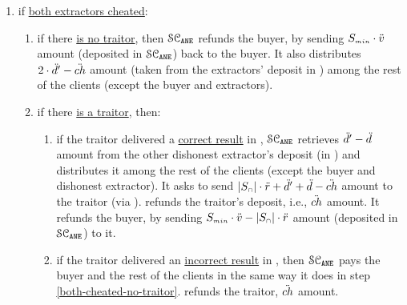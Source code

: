 \begin{itemize}
\begin{enumerate}
%
\item if \underline{both extractors cheated}:
%
\begin{enumerate}
%
\item\label{both-cheated-no-traitor} if there \underline{is no traitor}, then $\mathcal{SC}_{\mathtt{ANE}}$ refunds the buyer, by sending $S_{\scriptscriptstyle min}\cdot \ddot{v}$ amount (deposited in $\mathcal{SC}_{\mathtt{ANE}}$) back to the buyer. It also distributes $2\cdot \ddot{d}'- \ddot{ch}$ amount (taken from the extractors' deposit in \SCpc) among the rest of  the clients  (except the buyer and extractors). %
%
%
\item if there \underline{is a traitor}, then:
\begin{enumerate}
%
%
\item\label{both-cheated-honest-traitor} if the traitor delivered a \underline{correct result} in \SCtc, $\mathcal{SC}_{\mathtt{ANE}}$ retrieves $\ddot{d}'-\ddot{d}$ amount from the other dishonest extractor's deposit (in \SCpc) and distributes it among the rest of the clients (except the buyer and dishonest extractor). It asks \SCpc to send $|S_{\scriptscriptstyle\cap}|\cdot \ddot{r}+\ddot{d}'+\ddot{d}-\ddot{ch}$ amount to the traitor (via \SCtc). %
%
\SCtc refunds the traitor's deposit, i.e., $\ddot{ch}$ amount. It refunds the buyer, by sending $S_{\scriptscriptstyle min}\cdot \ddot{v}-|S_{\scriptscriptstyle\cap}|\cdot \ddot{r}$ amount (deposited in $\mathcal{SC}_{\mathtt{ANE}}$) to it.


%
\item if the traitor delivered an \underline{incorrect result} in \SCtc, then $\mathcal{SC}_{\mathtt{ANE}}$ pays the buyer and the rest of the clients in the same way it does in step \ref{both-cheated-no-traitor}. 
%
%
%
\SCtc refunds the traitor,  $\ddot{ch}$ amount.  %



\end{enumerate}
\end{enumerate}
\end{enumerate}
\end{itemize}
